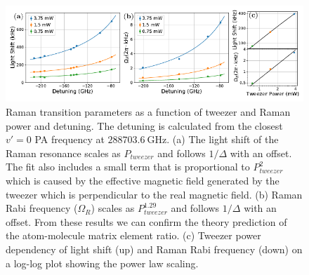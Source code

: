 \documentclass[aps,prl,twocolumn,10pt,superscriptaddress]{revtex4-1}
\begin{document}
\begin{figure}
  \includegraphics[width=\textwidth]{fig4.pdf}
  \caption{Raman transition parameters as a function of tweezer and Raman power and detuning.
    The detuning is calculated from the closest $v'=0$ PA frequency at $288703.6~\mathrm{GHz}$.
    (a) The light shift of the Raman resonance scales as $P_{tweezer}$
    and follows $1/\Delta$ with an offset.
    The fit also includes a small term that is proportional to $P_{tweezer}^2$
    which is caused by the effective magnetic field generated by the tweezer which is
    perpendicular to the real magnetic field.
    (b) Raman Rabi frequency ($\Omega_R$) scales as $P_{tweezer}^{1.29}$
    and follows $1/\Delta$ with an offset.
    From these results we can confirm the theory prediction of
    the atom-molecule matrix element ratio.
    (c) Tweezer power dependency of light shift (up) and Raman Rabi frequency (down)
    on a log-log plot showing the power law scaling.
    \label{f-det}}
\end{figure}
\end{document}
